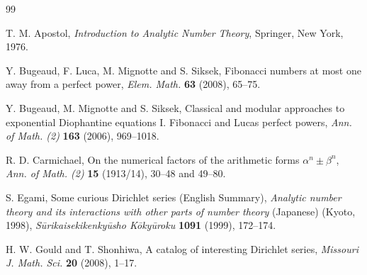 \documentclass[11pt, a4paper]{article}
\renewcommand{\Re}{\operatorname{Re}}
\theoremstyle{plain}
\theoremstyle{definition}
\begin{document}
\begin{thebibliography}{99}

T. M. Apostol,  
\textit{Introduction to Analytic Number Theory}, 
Springer, New York, 1976.



Y. Bugeaud, F. Luca, M. Mignotte and S. Siksek, 
{Fibonacci numbers at most one away from a perfect power}, 
\textit{Elem. Math.} \textbf{63} (2008), 65--75.

Y. Bugeaud, M. Mignotte and S. Siksek,
Classical and modular approaches to exponential Diophantine equations I. 
Fibonacci and Lucas perfect powers, 
\textit{Ann. of Math. (2)} \textbf{163} (2006), 969--1018.

R. D. Carmichael, 
On the numerical factors of the arithmetic forms $\alpha^n\pm \beta^n$,
\textit{Ann. of Math. (2)} \textbf{15} (1913/14), 30--48 and 49--80.


S. Egami, %
{Some curious Dirichlet series} (English Summary), 
\textit{Analytic number theory and its interactions with other
parts of number theory} (Japanese) (Kyoto, 1998),
\textit{S\={u}rikaisekikenky\={u}sho K\={o}ky\={u}roku} \textbf{1091} (1999), 172--174.

H. W. Gould and T. Shonhiwa,
A catalog of interesting Dirichlet series,
\textit{Missouri J. Math. Sci.} \textbf{20} (2008), 1--17. %


\end{thebibliography}
\end{document}
